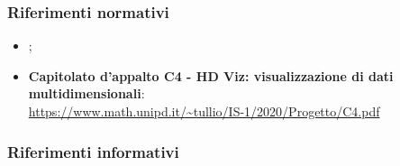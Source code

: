 \subsubsection{Riferimenti normativi}
\begin{itemize}	
\item \textbf{};
	
\item \textbf{Capitolato d'appalto C4 - HD Viz: visualizzazione di dati multidimensionali}:\\
	\textcolor{blue}{\url{https://www.math.unipd.it/~tullio/IS-1/2020/Progetto/C4.pdf}}

\end{itemize}

\subsubsection{Riferimenti informativi}
